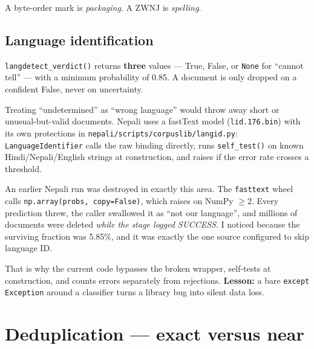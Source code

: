 \documentclass[11pt]{report}
\begin{document}
\begin{notebox}
A byte-order mark is \emph{packaging}. A ZWNJ is \emph{spelling}.
\end{notebox}

\subsection{Language identification}

\begin{shortans}
\texttt{langdetect\_verdict()} returns \textbf{three} values --- True, False, or
\texttt{None} for ``cannot tell'' --- with a minimum probability of 0.85. A
document is only dropped on a confident False, never on uncertainty.
\end{shortans}

\begin{deeper}
Treating ``undetermined'' as ``wrong language'' would throw away short or
unusual-but-valid documents. Nepali uses a fastText model
(\texttt{lid.176.bin}) with its own protections in
\texttt{nepali/scripts/corpuslib/langid.py}: \texttt{LanguageIdentifier} calls
the raw binding directly, runs \texttt{self\_test()} on known
Hindi/Nepali/English strings at construction, and raises if the error rate
crosses a threshold.
\end{deeper}

\begin{trap}
An earlier Nepali run was destroyed in exactly this area. The \texttt{fasttext}
wheel calls \texttt{np.array(probs, copy=False)}, which raises on NumPy $\ge$2.
Every prediction threw, the caller swallowed it as ``not our language'', and
millions of documents were deleted \emph{while the stage logged SUCCESS}. I
noticed because the surviving fraction was 5.85\%, and it was exactly the one
source configured to skip language ID.

\medskip
That is why the current code bypasses the broken wrapper, self-tests at
construction, and counts errors separately from rejections.
\textbf{Lesson:} a bare \texttt{except Exception} around a classifier turns a
library bug into silent data loss.
\end{trap}

\section{Deduplication --- exact versus near}
\end{document}
